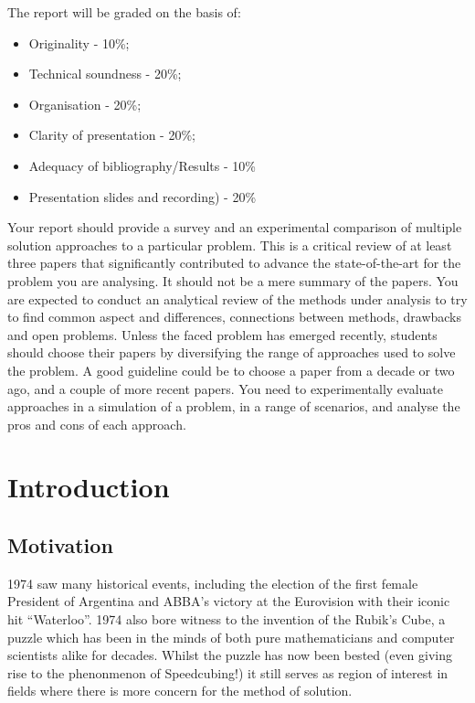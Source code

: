 \documentclass[UKenglish]{svproc}
\begin{document}
The report will be graded on the basis of:

\begin{itemize}
\item Originality - 10\%;
\item Technical soundness - 20\%;
\item Organisation - 20\%;
\item Clarity of presentation - 20\%;
\item Adequacy of bibliography/Results - 10\%
\item Presentation slides and recording) - 20\%
\end{itemize}





Your report should provide a survey and an experimental comparison of multiple solution approaches to a particular problem. This is a critical review of at least three papers that significantly contributed to advance the state-of-the-art for the problem you are analysing. It should not be a mere summary of the papers. You are expected to conduct an analytical review of the methods under analysis to try to find common aspect and differences, connections between methods, drawbacks and open problems. Unless the faced problem has emerged recently, students should choose their papers by diversifying the range of approaches used to solve the problem. A good guideline could be to choose a paper from a decade or two ago, and a couple of more recent papers. You need to experimentally evaluate approaches in a simulation of a problem, in a range of scenarios, and analyse the pros and cons of each approach. 
\fi

\section{Introduction}
\subsection{Motivation}
1974 saw many historical events, including the election of the first female President of Argentina and ABBA's victory at the Eurovision with their iconic hit ``Waterloo''. 1974 also bore witness to the invention of the Rubik's Cube, a puzzle which has been in the minds of both pure mathematicians and computer scientists alike for decades. Whilst the puzzle has now been bested (even giving rise to the phenonmenon of Speedcubing!) it still serves as region of interest in fields where there is more concern for the method of solution.\\
\end{document}
